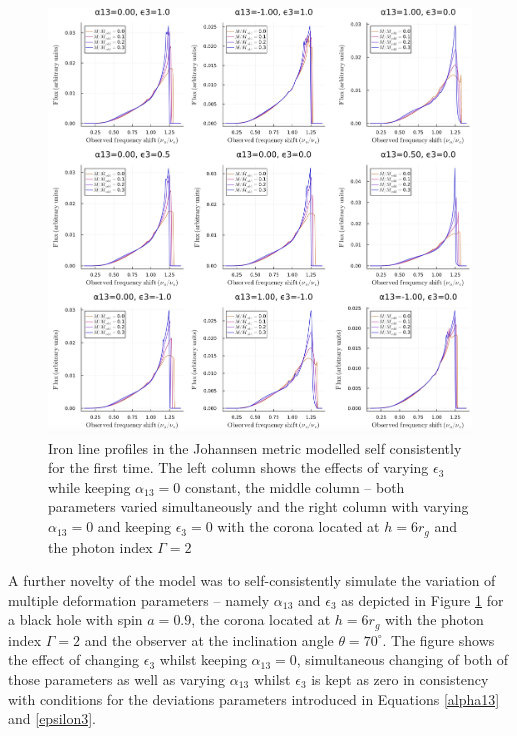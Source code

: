 \documentclass[fleqn,usenatbib,useAMS]{mnras}
\begin{document}
\begin{figure}[!h]
    \centering
    \includegraphics[width=0.98\linewidth]{figures/johannsen_deformation.png}
    \caption{Iron line profiles in the Johannsen metric modelled self consistently for the first time. The left column shows the effects of varying $\epsilon_{3}$ while keeping $\alpha_{13} = 0$ constant, the middle column -- both parameters varied simultaneously and the right column with varying $\alpha_{13} = 0$ and keeping $\epsilon_{3} = 0$ with the corona located at $h = 6 r_{g}$ and the photon index $\Gamma = 2$}
    \label{johannsen_deformation}
\end{figure}

A further novelty of the model was to self-consistently simulate the variation of multiple deformation parameters -- namely $\alpha_{13}$ and $\epsilon_{3}$ as depicted in Figure \ref{johannsen_deformation} for a black hole with spin $a = 0.9$, the corona located at $h = 6 r_{g}$ with the photon index $\Gamma = 2$ and the observer at the inclination angle $\theta = 70^{\circ}$. The figure shows the effect of changing $\epsilon_{3}$ whilst keeping $\alpha_{13} = 0$, simultaneous changing of both of those parameters as well as varying $\alpha_{13}$ whilst $\epsilon_{3}$ is kept as zero in consistency with conditions for the deviations parameters introduced in Equations \ref{alpha13} and \ref{epsilon3}. 
\end{document}
